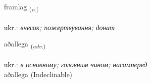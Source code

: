 \documentclass[frontgrid, backgrid]{flacards}\usepackage[]{graphicx}\usepackage[]{xcolor}
\begin{document}
\renewcommand{\flhead}{\vskip5pt \fboxsep=0pt {\small\bfseries\footnotesize Nafnorð | іменник}}
\renewcommand{\fcfoot}{\vskip5pt \fboxsep=0pt \hspace{2pt}{\small\bfseries\footnotesize 1K}}

\renewcommand{\blhead}{\vskip5pt {\small\bfseries\footnotesize Nafnorð | іменник }}
\renewcommand{\bcfoot}{\vskip5pt \hspace{2pt}{\small\bfseries\footnotesize 1K}}


{framlag \small{\textsubscript{(\textit{n.})}} \\[1ex] %
\textphonetic{[framlaɣ]} \\
ukr.: \emph{внесок; пожертвування; донат} \\  [2ex]
\renewcommand*{\arraystretch}{0.8}
}


\renewcommand{\flhead}{\vskip5pt \fboxsep=0pt {\small\bfseries\footnotesize Atviksorð | прислівник}}
\renewcommand{\fcfoot}{\vskip5pt \fboxsep=0pt \hspace{2pt}{\small\bfseries\footnotesize 1K}}

\renewcommand{\blhead}{\vskip5pt {\small\bfseries\footnotesize Atviksorð | прислівник }}
\renewcommand{\bcfoot}{\vskip5pt \hspace{2pt}{\small\bfseries\footnotesize 1K}}


{aðallega \small{\textsubscript{(\textit{adv.})}} \\[1ex]
\textphonetic{[aːðalɛɣa]} \\
ukr.: \emph{в основному; головним чином; насамперед} \\  [2ex]
aðallega (Indeclinable)}
\end{document}
